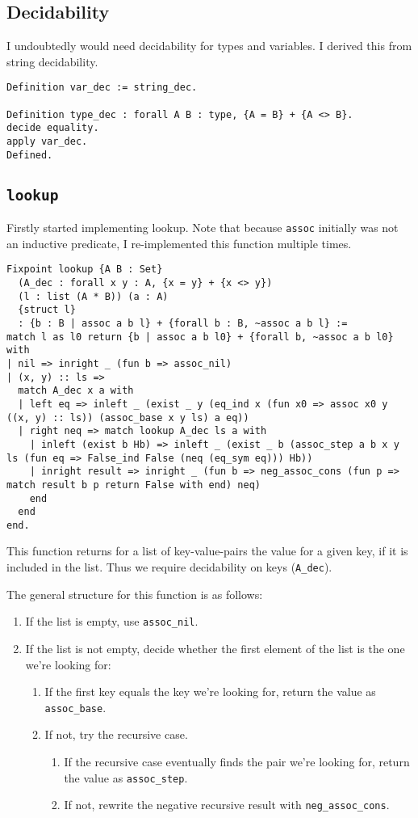 \documentclass[a4paper, 10pt]{amsart}
\begin{document}
	\subsection{Decidability}
	
		I undoubtedly would need decidability for types and variables.
		I derived this from string decidability.
\begin{lstlisting}
Definition var_dec := string_dec.

Definition type_dec : forall A B : type, {A = B} + {A <> B}.
decide equality.
apply var_dec.
Defined.
\end{lstlisting}

	\subsection{\lstinline{lookup}}
		
		Firstly started implementing lookup.
		Note that because \lstinline{assoc} initially was not an inductive predicate, I re-implemented this function multiple times.
\begin{lstlisting}
Fixpoint lookup {A B : Set}
  (A_dec : forall x y : A, {x = y} + {x <> y})
  (l : list (A * B)) (a : A)
  {struct l}
  : {b : B | assoc a b l} + {forall b : B, ~assoc a b l} :=
match l as l0 return {b | assoc a b l0} + {forall b, ~assoc a b l0} with
| nil => inright _ (fun b => assoc_nil)
| (x, y) :: ls =>
  match A_dec x a with
  | left eq => inleft _ (exist _ y (eq_ind x (fun x0 => assoc x0 y ((x, y) :: ls)) (assoc_base x y ls) a eq))
  | right neq => match lookup A_dec ls a with
    | inleft (exist b Hb) => inleft _ (exist _ b (assoc_step a b x y ls (fun eq => False_ind False (neq (eq_sym eq))) Hb))
    | inright result => inright _ (fun b => neg_assoc_cons (fun p => match result b p return False with end) neq)
    end
  end
end.
\end{lstlisting}
		This function returns for a list of key-value-pairs the value for a given key, if it is included in the list.
		Thus we require decidability on keys (\lstinline{A_dec}).
		
		The general structure for this function is as follows:
		\begin{enumerate}
			\item If the list is empty, use \lstinline{assoc_nil}.
			\item If the list is not empty, decide whether the first element of the list is the one we're looking for:
				\begin{enumerate}
					\item If the first key equals the key we're looking for, return the value as \lstinline{assoc_base}.
					\item If not, try the recursive case.
						\begin{enumerate}
							\item If the recursive case eventually finds the pair we're looking for, return the value as \lstinline{assoc_step}.
							\item If not, rewrite the negative recursive result with \lstinline{neg_assoc_cons}.
						\end{enumerate}
				\end{enumerate}
		\end{enumerate}
	
\end{document}
